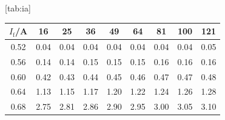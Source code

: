 [tab:ia]{
\begin{tabular}{ccccccccc}
\toprule
$I_\mathrm{f}$/A & 16 & 25 & 36 & 49 & 64 & 81 & 100 & 121 \\
\midrule
0.52 & 0.04 & 0.04 & 0.04 & 0.04 & 0.04 & 0.04 & 0.04 & 0.05 \\
0.56 & 0.14 & 0.14 & 0.15 & 0.15 & 0.15 & 0.16 & 0.16 & 0.16 \\
0.60 & 0.42 & 0.43 & 0.44 & 0.45 & 0.46 & 0.47 & 0.47 & 0.48 \\
0.64 & 1.13 & 1.15 & 1.17 & 1.20 & 1.22 & 1.24 & 1.26 & 1.28 \\
0.68 & 2.75 & 2.81 & 2.86 & 2.90 & 2.95 & 3.00 & 3.05 & 3.10 \\
\bottomrule
\end{tabular}}
